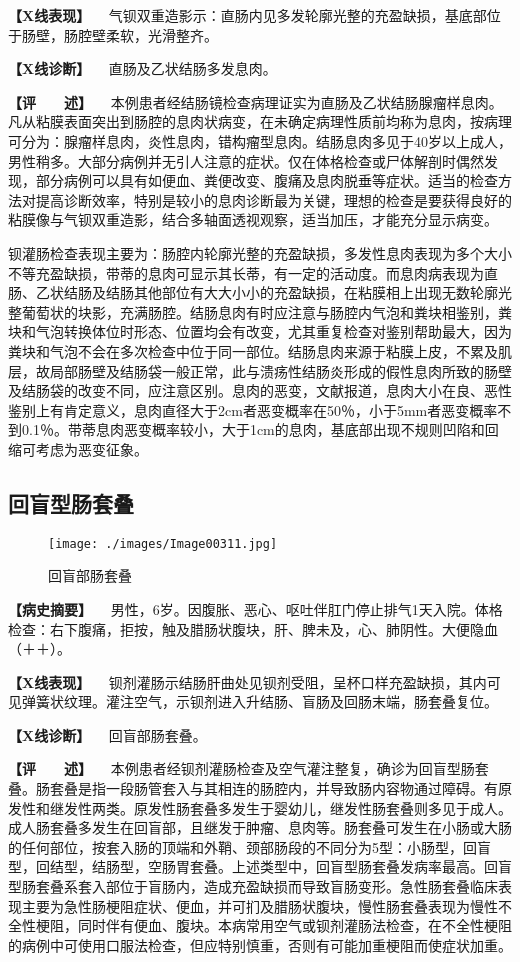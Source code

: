 \textbf{【X线表现】}
　气钡双重造影示：直肠内见多发轮廓光整的充盈缺损，基底部位于肠壁，肠腔壁柔软，光滑整齐。

\textbf{【X线诊断】} 　直肠及乙状结肠多发息肉。

\textbf{【评　　述】}
　本例患者经结肠镜检查病理证实为直肠及乙状结肠腺瘤样息肉。凡从粘膜表面突出到肠腔的息肉状病变，在未确定病理性质前均称为息肉，按病理可分为：腺瘤样息肉，炎性息肉，错构瘤型息肉。结肠息肉多见于40岁以上成人，男性稍多。大部分病例并无引人注意的症状。仅在体格检查或尸体解剖时偶然发现，部分病例可以具有如便血、粪便改变、腹痛及息肉脱垂等症状。适当的检查方法对提高诊断效率，特别是较小的息肉诊断最为关键，理想的检查是要获得良好的粘膜像与气钡双重造影，结合多轴面透视观察，适当加压，才能充分显示病变。

钡灌肠检查表现主要为：肠腔内轮廓光整的充盈缺损，多发性息肉表现为多个大小不等充盈缺损，带蒂的息肉可显示其长蒂，有一定的活动度。而息肉病表现为直肠、乙状结肠及结肠其他部位有大大小小的充盈缺损，在粘膜相上出现无数轮廓光整葡萄状的块影，充满肠腔。结肠息肉有时应注意与肠腔内气泡和粪块相鉴别，粪块和气泡转换体位时形态、位置均会有改变，尤其重复检查对鉴别帮助最大，因为粪块和气泡不会在多次检查中位于同一部位。结肠息肉来源于粘膜上皮，不累及肌层，故局部肠壁及结肠袋一般正常，此与溃疡性结肠炎形成的假性息肉所致的肠壁及结肠袋的改变不同，应注意区别。息肉的恶变，文献报道，息肉大小在良、恶性鉴别上有肯定意义，息肉直径大于2cm者恶变概率在50％，小于5mm者恶变概率不到0.1％。带蒂息肉恶变概率较小，大于1cm的息肉，基底部出现不规则凹陷和回缩可考虑为恶变征象。

\subsection{回盲型肠套叠}

\begin{figure}[!htbp]
 \centering
 \texttt{[image: ./images/Image00311.jpg]}
 \captionsetup{justification=centering}
 \caption{回盲部肠套叠}
 \label{fig5-6-5}
  \end{figure} 

\textbf{【病史摘要】}
　男性，6岁。因腹胀、恶心、呕吐伴肛门停止排气1天入院。体格检查：右下腹痛，拒按，触及腊肠状腹块，肝、脾未及，心、肺阴性。大便隐血（＋＋）。

\textbf{【X线表现】}
　钡剂灌肠示结肠肝曲处见钡剂受阻，呈杯口样充盈缺损，其内可见弹簧状纹理。灌注空气，示钡剂进入升结肠、盲肠及回肠末端，肠套叠复位。

\textbf{【X线诊断】} 　回盲部肠套叠。

\textbf{【评　　述】}
　本例患者经钡剂灌肠检查及空气灌注整复，确诊为回盲型肠套叠。肠套叠是指一段肠管套入与其相连的肠腔内，并导致肠内容物通过障碍。有原发性和继发性两类。原发性肠套叠多发生于婴幼儿，继发性肠套叠则多见于成人。成人肠套叠多发生在回盲部，且继发于肿瘤、息肉等。肠套叠可发生在小肠或大肠的任何部位，按套入肠的顶端和外鞘、颈部肠段的不同分为5型：小肠型，回盲型，回结型，结肠型，空肠胃套叠。上述类型中，回盲型肠套叠发病率最高。回盲型肠套叠系套入部位于盲肠内，造成充盈缺损而导致盲肠变形。急性肠套叠临床表现主要为急性肠梗阻症状、便血，并可扪及腊肠状腹块，慢性肠套叠表现为慢性不全性梗阻，同时伴有便血、腹块。本病常用空气或钡剂灌肠法检查，在不全性梗阻的病例中可使用口服法检查，但应特别慎重，否则有可能加重梗阻而使症状加重。

